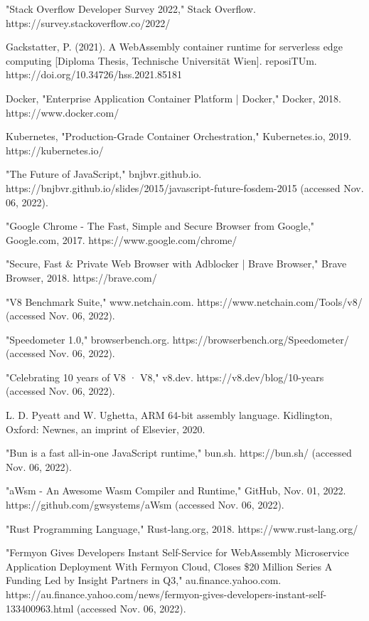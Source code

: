 \begin{thebibliography}{9}
"Stack Overflow Developer Survey 2022," Stack Overflow. https://survey.stackoverflow.co/2022/

Gackstatter, P. (2021). A WebAssembly container runtime for serverless edge computing [Diploma Thesis, Technische Universität Wien]. reposiTUm. https://doi.org/10.34726/hss.2021.85181

Docker, "Enterprise Application Container Platform | Docker," Docker, 2018. https://www.docker.com/

Kubernetes, "Production-Grade Container Orchestration," Kubernetes.io, 2019. https://kubernetes.io/

"The Future of JavaScript," bnjbvr.github.io. https://bnjbvr.github.io/slides/2015/javascript-future-fosdem-2015 (accessed Nov. 06, 2022).

"Google Chrome - The Fast, Simple and Secure Browser from Google," Google.com, 2017. https://www.google.com/chrome/

"Secure, Fast \& Private Web Browser with Adblocker | Brave Browser," Brave Browser, 2018. https://brave.com/

"V8 Benchmark Suite," www.netchain.com. https://www.netchain.com/Tools/v8/ (accessed Nov. 06, 2022).

"Speedometer 1.0," browserbench.org. https://browserbench.org/Speedometer/ (accessed Nov. 06, 2022).

"Celebrating 10 years of V8 · V8," v8.dev. https://v8.dev/blog/10-years (accessed Nov. 06, 2022).

L. D. Pyeatt and W. Ughetta, ARM 64-bit assembly language. Kidlington, Oxford: Newnes, an imprint of Elsevier, 2020.

"Bun is a fast all-in-one JavaScript runtime," bun.sh. https://bun.sh/ (accessed Nov. 06, 2022).

"aWsm - An Awesome Wasm Compiler and Runtime," GitHub, Nov. 01, 2022. https://github.com/gwsystems/aWsm (accessed Nov. 06, 2022).

"Rust Programming Language," Rust-lang.org, 2018. https://www.rust-lang.org/

"Fermyon Gives Developers Instant Self-Service for WebAssembly Microservice Application Deployment With Fermyon Cloud, Closes \$20 Million Series A Funding Led by Insight Partners in Q3," au.finance.yahoo.com. https://au.finance.yahoo.com/news/fermyon-gives-developers-instant-self-133400963.html (accessed Nov. 06, 2022).


\end{thebibliography}
